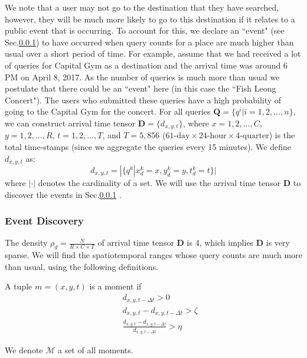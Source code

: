 We note that a user may not go to the destination that they have searched, however, they will be much more likely to go to this destination if it relates to a public event that is occurring. To account for this, we declare an ``event" (see Sec.\ref{eventdiscovery}) to have occurred when query counts for a place are much higher than usual over a short period of time. For example, assume that we had received a lot of queries for Capital Gym as a destination and the arrival time was around 6 PM on April 8, 2017. As the number of queries is much more than usual we postulate that there could be an ``event" here (in this case the ``Fish Leong Concert"). The users who submitted these queries have a high probability of going to the Capital Gym for the concert. For all queries $\bm{Q}=\{q^i|i = 1, 2, \dots, n\}$, we can construct arrival time tensor $\bm{D}=\{d_{x, y, t}\}$, where $x=1, 2, \dots, C$, $y=1, 2, \dots, R$, $t=1, 2, \dots, T$, and $T=5,856$ ($61\text{-day} \times 24\text{-hour} \times 4\text{-quarter}$) is the total time-stamps (since we aggregate the queries every 15 minutes). We define $d_{x, y, t}$ as:
\begin{equation}
	\label{eq:sdxyt}
    d_{x, y, t} = |\{q^k|x_d^k=x, y_d^k=y, t_d^k=t\}|
\end{equation}
\noindent where $|\cdot|$ denotes the cardinality of a set. We will use the arrival time tensor $\bm{D}$ to discover the events in Sec.\ref{eventdiscovery} .


\subsubsection{Event Discovery}
\label{eventdiscovery}
The density $\rho_d = \frac{N}{R \times C\times T}$ of arrival time tensor $\bm{D}$ is 4, which implies $\bm{D}$ is very sparse. We will find the spatiotemporal ranges whose query counts are much more than usual, using the following definitions.

\begin{definition}[Moment]
    \label{def:moment}
    A tuple $m =  (x, y, t)$ is a moment if 
    \begin{eqnarray}
	\label{eq:moment}
    && d_{x, y, t-\Delta t} > 0 \\
    && d_{x, y, t} - d_{x, y, t-\Delta t} > \zeta \\ 
    && \frac{d_{x, y, t} - d_{x, y, t-\Delta t}}{d_{x, y, t-\Delta t}} > \eta
  	\end{eqnarray}    
\end{definition}
We denote $\mathcal{M}$ a set of all moments.

